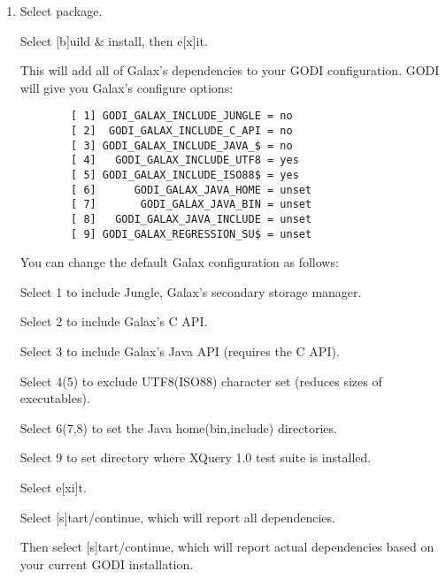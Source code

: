 \begin{enumerate}
\begin{enumerate}
     GODI will give you the BDB library configure options:

\begin{verbatim}
        [ 1] GODI_BDB_INCDIR =
        [ 2] GODI_BDB_LIBDIR =
\end{verbatim}

Select 1 to set the path to the directory containing db.h. (version 4.4 or higher).

Select 2 to set the path to the directory containing libdb.a (version 4.4 or higher).

Select e[x]it twice to return to the main menu.

     \item  Select  package.

     Select [b]uild \& install, then e[x]it.

     This will add all of Galax's dependencies to your GODI configuration. GODI will give you Galax's configure options:

\begin{verbatim}
		[ 1] GODI_GALAX_INCLUDE_JUNGLE = no
		[ 2]  GODI_GALAX_INCLUDE_C_API = no
		[ 3] GODI_GALAX_INCLUDE_JAVA_$ = no
		[ 4]   GODI_GALAX_INCLUDE_UTF8 = yes
		[ 5] GODI_GALAX_INCLUDE_ISO88$ = yes
		[ 6]      GODI_GALAX_JAVA_HOME = unset
		[ 7]       GODI_GALAX_JAVA_BIN = unset
		[ 8]   GODI_GALAX_JAVA_INCLUDE = unset
		[ 9] GODI_GALAX_REGRESSION_SU$ = unset
\end{verbatim}

        You can change the default Galax configuration as follows:

        Select 1 to include Jungle, Galax's secondary storage manager.

        Select 2 to include Galax's C API. 

        Select 3 to include Galax's Java API (requires the C API).

        Select 4(5) to exclude UTF8(ISO88) character set (reduces sizes of executables).

        Select 6(7,8) to set the Java home(bin,include) directories.

        Select 9 to set directory where XQuery 1.0 test suite is installed.

        Select e[xi]t.

        Select [s]tart/continue, which will report all dependencies.

        Then select [s]tart/continue, which will report actual dependencies based on your current GODI installation.


\end{enumerate}
\end{enumerate}
